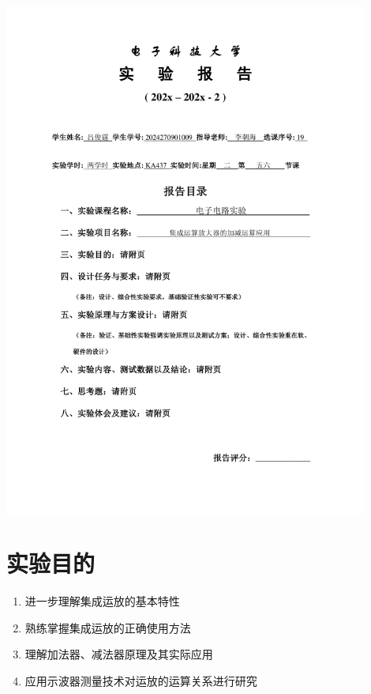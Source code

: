 \documentclass[10pt, a4paper]{article} %
\begin{document}
\begin{titlepage}
    \centering
    \includegraphics[page=1, width=0.9\textwidth, keepaspectratio]{image/实验报告撰写封面.pdf}
    \restoregeometry
\end{titlepage}

\setcounter{section}{2}

\section{实验目的}

\begin{enumerate}[leftmargin=50pt,label=(\arabic*)] %
    \item 进一步理解集成运放的基本特性
    \item 熟练掌握集成运放的正确使用方法
    \item 理解加法器、减法器原理及其实际应用
    \item 应用示波器测量技术对运放的运算关系进行研究
\end{enumerate}
\end{document}
